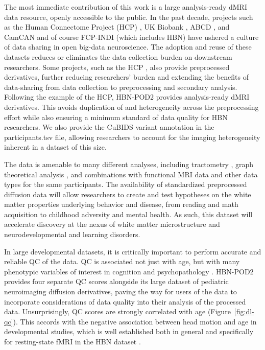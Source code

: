 \documentclass[9pt,lineno]{elife}
\begin{document}
The most immediate contribution of this work is a large analysis-ready dMRI
data resource, openly accessible to the public. In the past decade, projects such as
the Human Connectome Project (HCP) \citep{van-essen2013-oi}, UK Biobank
\citep{miller2016-mq}, ABCD \citep{jernigan2018-my}, and CamCAN
\citep{taylor2017-or,shafto2014-ld} and of course FCP-INDI (which includes HBN)
\citep{Mennes2013-eu} have ushered a culture of data sharing in open big-data
neuroscience. The adoption and reuse of these datasets reduces or eliminates the
data collection burden on downstream researchers. Some projects, such as the HCP
\citep{glasser2013-lo}, also provide preprocessed derivatives, further reducing
researchers' burden and extending the benefits of data-sharing from data
collection to preprocessing and secondary analysis. Following the example of the
HCP, HBN-POD2 provides analysis-ready dMRI derivatives. This avoids duplication
of and heterogeneity across the preprocessing effort while also ensuring a minimum standard of data quality
for HBN researchers.
We also provide the CuBIDS variant annotation in the participants.tsv file, allowing researchers to account for the imaging heterogeneity inherent in a dataset of this size.

The data is amenable to many different analyses, including
tractometry \citep{yeatman2012-rc, yeatman2018browser, kruper2021evaluating}, graph theoretical analysis \citep{yeh2020-nu},
and combinations with functional MRI data and other data types for the same
participants. The availability of standardized preprocessed diffusion data will
allow researchers to create and test hypotheses on the white matter properties
underlying behavior and disease, from reading and math acquisition to childhood
adversity and mental health. As such, this dataset will accelerate discovery at
the nexus of white matter microstructure and neurodevelopmental and learning
disorders.

In large developmental datasets, it is critically important to perform accurate and reliable QC of
the data.
QC is associated not just with age, but with many
phenotypic variables of interest in cognition and psychopathology \cite{siegel2017quality}.
HBN-POD2 provides four separate QC scores alongside its large dataset
of pediatric neuroimaging diffusion derivatives, paving the way for users of the
data to incorporate considerations of data quality into their analysis of the
processed data. Unsurprisingly, QC scores are strongly correlated with
age (Figure~\ref{fig:dl-qc}). This accords with the negative association
between head motion and age in developmental studies, which is well established both in general
\citep{power2012spurious,satterthwaite2012impact,fair2012distinct,yendiki2014spurious}
and specifically for resting-state fMRI in the HBN dataset \citep{alexander2017-yc}.
\end{document}

